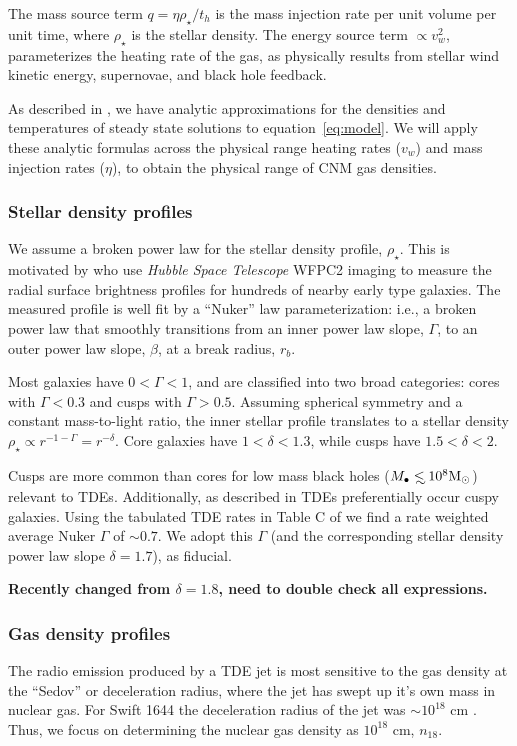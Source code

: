 \documentclass[usenatbib,fleqn]{mnras}
\newcommand\lsim{\mathrel{\rlap{\lower4pt\hbox{\hskip1pt$\sim$}}
    \raise1pt\hbox{$<$}}}
\newcommand{\Mbh}[1][]{M_{\bullet#1}}
\renewcommand{\th}{t_h}
\newcommand{\Msun}{{\rm M_\odot}}
\begin{document}
The mass source term $q =\eta \rho_\star/\th$ is the mass injection
rate per unit volume per unit time, where $\rho_\star$ is the stellar
density. The energy source term $\propto v_w^{2}$, parameterizes the
heating rate of the gas, as physically results from stellar wind
kinetic energy, supernovae, and black hole feedback.

As described in \citet{Generozov+2015}, we have analytic approximations
for the densities and temperatures of steady state solutions to
equation~\eqref{eq:model}. We will apply these analytic formulas
across the physical range heating rates ($v_w$) and mass injection
rates ($\eta$), to obtain the physical range of CNM gas densities.

\subsubsection{Stellar density profiles}
We assume a broken power law for the stellar density profile, $\rho_{\star}$.
This is motivated by \citet{Lauer+2007} who use {\it
  Hubble Space Telescope} WFPC2 imaging to measure the radial surface
brightness profiles for hundreds of nearby early type galaxies. The
measured profile is well fit by a ``Nuker'' law parameterization:
i.e., a broken power law that smoothly transitions from an inner power law
slope, $\Gamma$, to an outer power law slope, $\beta$, at a break
radius, $r_b$.

Most galaxies have $0<\Gamma<1$, and are classified into two broad
categories: cores with $\Gamma<0.3$ and cusps with
$\Gamma>0.5$. Assuming spherical symmetry and a constant mass-to-light
ratio, the inner stellar profile translates to a stellar density
$\rho_\star\propto r^{-1-\Gamma}=r^{-\delta}$. Core galaxies have
$1<\delta<1.3$, while cusps have $1.5<\delta<2$.

Cusps are more common than cores for low mass black holes ($\Mbh\lsim
10^{8} \Msun$) relevant to TDEs. Additionally, as described in
\citet{Stone&Metzger2016} TDEs preferentially occur cuspy
galaxies. Using the tabulated TDE rates in Table C of
\citet{Stone&Metzger2016} we find a rate weighted average Nuker
$\Gamma$ of $\sim 0.7$. We adopt this $\Gamma$ (and the corresponding
stellar density power law slope $\delta=1.7$), as fiducial.

 {\bf Recently changed from $\delta=1.8$, need to
  double check all expressions.}

\subsubsection{Gas density profiles}
The radio emission produced by a TDE jet is most sensitive to the gas
density at the ``Sedov'' or deceleration radius, where the jet has
swept up it's own mass in nuclear gas. For Swift 1644 the deceleration
radius of the jet was $\sim 10^{18}$
cm \citep{Mimica+2015}. Thus, we focus on determining the nuclear gas
density as $10^{18}$ cm, $n_{18}$.  
\end{document}
